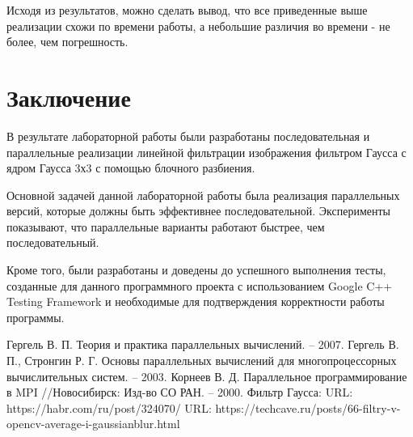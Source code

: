 \documentclass{report}
\begin{document}
\par Исходя из результатов, можно сделать вывод, что все приведенные выше реализации схожи по времени работы, а небольшие различия во времени - не более, чем погрешность. 
\newpage

\section*{Заключение}
В результате лабораторной работы были разработаны последовательная и параллельные реализации линейной фильтрации изображения фильтром Гаусса с ядром Гаусса 3х3 с помощью блочного разбиения.
\par Основной задачей данной лабораторной работы была реализация параллельных версий, которые должны быть эффективнее последовательной. Эксперименты показывают, что параллельные варианты работают быстрее, чем последовательный.
\par Кроме того, были разработаны и доведены до успешного выполнения тесты, созданные для данного программного проекта с использованием Google C++ Testing Framework и необходимые для подтверждения корректности работы программы.
\newpage
\begin{thebibliography}{1}
Гергель В. П. Теория и практика параллельных вычислений. – 2007. 
Гергель В. П., Стронгин Р. Г. Основы параллельных вычислений для многопроцессорных вычислительных систем. – 2003.
Корнеев В. Д. Параллельное программирование в MPI //Новосибирск: Изд-во СО РАН. – 2000.
Фильтр Гаусса: URL: https://habr.com/ru/post/324070/
URL: https://techcave.ru/posts/66-filtry-v-opencv-average-i-gaussianblur.html
\end{thebibliography}
\newpage

\end{document}
